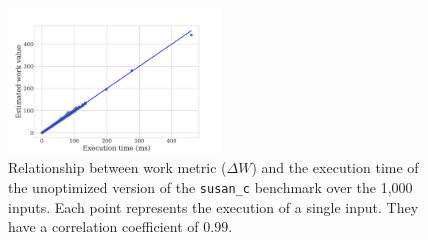 
    \begin{figure}[t]
        \centering
        \includegraphics[width=0.5\textwidth]{figs/work-correlation-with-O0_susan_c.pdf}
        \caption{
            Relationship between work metric ($\Delta W$) and the execution time
            of the unoptimized version of the \texttt{susan\_c} benchmark over the
            1,000 inputs.
            Each point represents the execution of a single input.
            They have a correlation coefficient of $0.99$.
        }
        \label{fig:work-vs-O0time}
    \end{figure}


